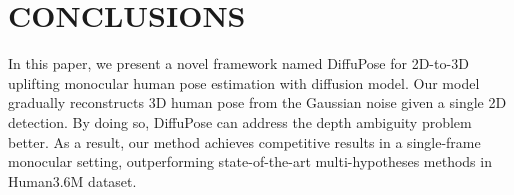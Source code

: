 \documentclass[letterpaper, 10 pt, conference]{ieeeconf}
\begin{document}
\section{CONCLUSIONS}

In this paper, we present a novel framework named DiffuPose for 2D-to-3D uplifting monocular human pose estimation with diffusion model.
Our model gradually reconstructs 3D human pose from the Gaussian noise given a single 2D detection.
By doing so, DiffuPose can address the depth ambiguity problem better.
As a result, our method achieves competitive results in a single-frame monocular setting, outperforming state-of-the-art multi-hypotheses methods in Human3.6M dataset.













\end{document}
